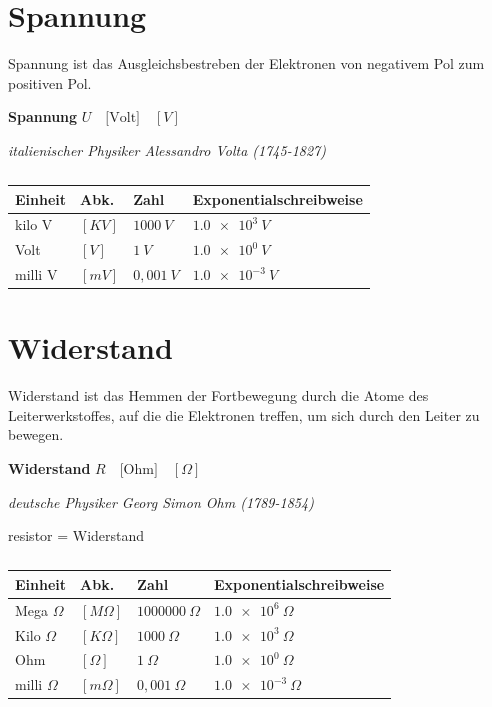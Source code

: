 \newpage

\section{Spannung}\label{spannung}

Spannung ist das Ausgleichsbestreben der Elektronen von negativem Pol
zum positiven Pol.

\textbf{Spannung} $U \quad \text{[Volt]} \quad [V]$

\emph{italienischer Physiker Alessandro Volta (1745-1827)}

\begin{table}[!ht]%
\centering 
	\caption{}%
\begin{tabular}{@{}llll@{}}
\hline
\textbf{Einheit} & \textbf{Abk.} & \textbf{Zahl} &
\textbf{Exponentialschreibweise} \\
\hline
kilo V & $[KV]$ & $1000~V$ & $\num{1,0e3}~V$ \\
Volt & $[V]$ & $1~V$ & $\num{1,0e0}~V$ \\
milli V & $[mV]$ & $0,001~V$ & $\num{1,0e-3}~V$ \\
\hline
\end{tabular} 
\end{table}

\section{Widerstand}\label{widerstand}

Widerstand ist das Hemmen der Fortbewegung durch die Atome des
Leiterwerkstoffes, auf die die Elektronen treffen, um sich durch den
Leiter zu bewegen.

\textbf{Widerstand} $R \quad \text{[Ohm]} \quad [\Omega]$

\emph{deutsche Physiker Georg Simon Ohm (1789-1854)}

resistor = Widerstand

\begin{table}[!ht]%
\centering 
	\caption{}%
\begin{tabular}{@{}llll@{}}
\hline
\textbf{Einheit} & \textbf{Abk.} & \textbf{Zahl} &
\textbf{Exponentialschreibweise} \\
\hline
Mega $\Omega$ & $[M\Omega]$ & $1000000~\Omega$ &
$\num{1,0e6}~\Omega$ \\
Kilo $\Omega$ & $[K\Omega]$ & $1000~\Omega$ &
$\num{1,0e3}~\Omega$ \\
Ohm & $[\Omega]$ & $1~\Omega$ & $\num{1,0e0}~\Omega$ \\
milli $\Omega$ & $[m\Omega]$ & $0,001~\Omega$ &
$\num{1,0e-3}~\Omega$ \\
\hline
\end{tabular} 
\end{table}

